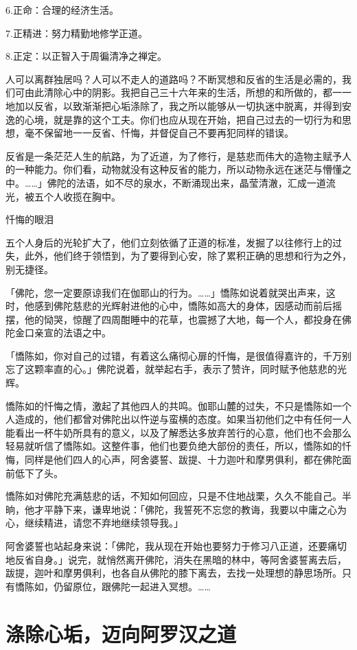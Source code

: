 \documentclass[12pt,twoside,openany]{book}
\begin{document}
6.正命：合理的经济生活。

7.正精进：努力精勤地修学正道。

8.正定：以正智入于周徧清净之禅定。

人可以离群独居吗？人可以不走人的道路吗？不断冥想和反省的生活是必需的，我们可由此清除心中的阴影。我把自己三十六年来的生活，所想的和所做的，都一一地加以反省，以致渐渐把心垢涤除了，我之所以能够从一切执迷中脱离，并得到安逸的心境，就是靠的这个工夫。你们也应从现在开始，把自己过去的一切行为和思想，毫不保留地一一反省、忏悔，并督促自己不要再犯同样的错误。

反省是一条茫茫人生的航路，为了近道，为了修行，是慈悲而伟大的造物主赋予人的一种能力。你们看，动物就没有这种反省的能力，所以动物永远在迷茫与懵懂之中。……」佛陀的法语，如不尽的泉水，不断涌现出来，晶莹清澈，汇成一道流光，被五个人收揽在胸中。

忏悔的眼泪

五个人身后的光轮扩大了，他们立刻依循了正道的标准，发掘了以往修行上的过失，此外，他们终于领悟到，为了要得到心安，除了累积正确的思想和行为之外，别无捷径。

「佛陀，您一定要原谅我们在伽耶山的行为。……」憍陈如说着就哭出声来，这时，他感到佛陀慈悲的光辉射进他的心中，憍陈如高大的身体，因感动而前后摇摆，他的恸哭，惊醒了四周酣睡中的花草，也震撼了大地，每一个人，都投身在佛陀金口亲宣的法语之中。

「憍陈如，你对自己的过错，有着这么痛彻心扉的忏悔，是很值得嘉许的，千万别忘了这颗率直的心。」佛陀说着，就举起右手，表示了赞许，同时赋予他慈悲的光辉。

憍陈如的忏悔之情，激起了其他四人的共鸣。伽耶山麓的过失，不只是憍陈如一个人造成的，他们都曾对佛陀出以忤逆与蛮横的态度。如果当初他们之中有任何一人能看出一杯牛奶所具有的意义，以及了解悉达多放弃苦行的心意，他们也不会那么轻易就听信了憍陈如。这整件事，他们也要负绝大部份的责任，所以，憍陈如的忏悔，同样是他们四人的心声，阿舍婆誓、跋提、十力迦叶和摩男俱利，都在佛陀面前低下了头。

憍陈如对佛陀充满慈悲的话，不知如何回应，只是不住地战栗，久久不能自己。半晌，他才平静下来，谦卑地说：「佛陀，我誓死不忘您的教诲，我要以中庸之心为心，继续精进，请您不弃地继续领导我。」

阿舍婆誓也站起身来说：「佛陀，我从现在开始也要努力于修习八正道，还要痛切地反省自身。」说完，就悄然离开佛陀，消失在黑暗的林中，等阿舍婆誓离去后，跋提，迦叶和摩男俱利，也各自从佛陀的膝下离去，去找一处理想的静思场所。只有憍陈如，仍留原位，跟佛陀一起进入冥想。……

\section{涤除心垢，迈向阿罗汉之道}\label{sec2.6}
\end{document}
